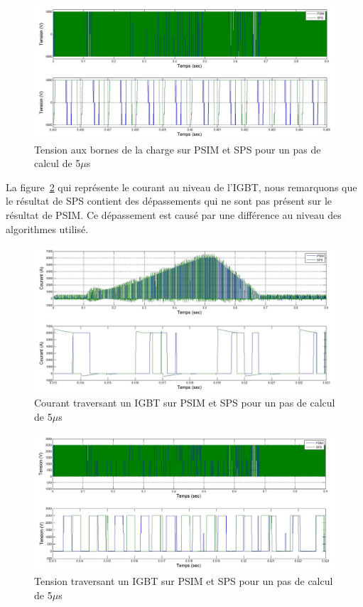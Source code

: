 \documentclass[11pt,letterpaper,final]{report}
\begin{document}
\begin{figure}[htb]
\centering
\includegraphics[scale=0.5]{Fig/DCPDCN/DCPTensionCharge5u.jpg}
\caption{Tension aux bornes de la charge sur PSIM et SPS pour un pas de calcul de 5$\mu$s}
\label{DC_ch_ten_5}
\end{figure}

La figure~\ref{DC_IG_cou_5} qui représente le courant au niveau de l'IGBT, nous remarquons que le résultat de SPS contient des dépassements qui ne sont pas présent sur le résultat de PSIM. Ce dépassement est causé par une différence au niveau des algorithmes utilisé.

\begin{figure}[htb]
\centering
\includegraphics[scale=0.5]{Fig/DCPDCN/DCPCourantIGBT5u.jpg}
\caption{Courant traversant un IGBT sur PSIM et SPS pour un pas de calcul de 5$\mu$s}
\label{DC_IG_cou_5}
\end{figure}



\begin{figure}[htb]
\centering
\includegraphics[scale=0.5]{Fig/DCPDCN/DCPTensionIGBT5u.jpg}
\caption{Tension traversant un IGBT sur PSIM et SPS pour un pas de calcul de 5$\mu$s}
\label{DC_IG_ten_5}
\end{figure}
\end{document}
